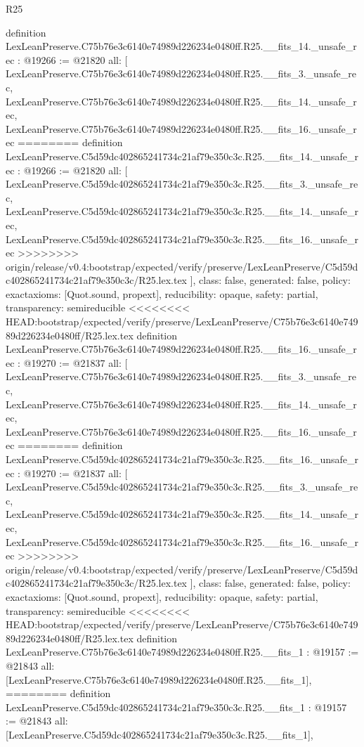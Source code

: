 \begin{lexlean}{R25}
\begin{coremodule}
{{{{{{{{{{{{{{{{{{{{{{{{{{{{{{{{{{{{{{{{{{{{{{{{{{{{{{{{{{{{{{{{{{{{{{{{{{{{{{{{{{{{{{{{{definition LexLeanPreserve.C75b76e3c6140e74989d226234e0480ff.R25.__fits_14._unsafe_rec : @19266 := @21820 {
  all: [
    LexLeanPreserve.C75b76e3c6140e74989d226234e0480ff.R25.__fits_3._unsafe_rec,
    LexLeanPreserve.C75b76e3c6140e74989d226234e0480ff.R25.__fits_14._unsafe_rec,
    LexLeanPreserve.C75b76e3c6140e74989d226234e0480ff.R25.__fits_16._unsafe_rec
========
definition LexLeanPreserve.C5d59dc402865241734c21af79e350c3c.R25.__fits_14._unsafe_rec : @19266 := @21820 {
  all: [
    LexLeanPreserve.C5d59dc402865241734c21af79e350c3c.R25.__fits_3._unsafe_rec,
    LexLeanPreserve.C5d59dc402865241734c21af79e350c3c.R25.__fits_14._unsafe_rec,
    LexLeanPreserve.C5d59dc402865241734c21af79e350c3c.R25.__fits_16._unsafe_rec
>>>>>>>> origin/release/v0.4:bootstrap/expected/verify/preserve/LexLeanPreserve/C5d59dc402865241734c21af79e350c3c/R25.lex.tex
  ],
  class: false,
  generated: false,
  policy: exact{axioms: [Quot.sound, propext]},
  reducibility: opaque{},
  safety: partial,
  transparency: semireducible
}
<<<<<<<< HEAD:bootstrap/expected/verify/preserve/LexLeanPreserve/C75b76e3c6140e74989d226234e0480ff/R25.lex.tex
definition LexLeanPreserve.C75b76e3c6140e74989d226234e0480ff.R25.__fits_16._unsafe_rec : @19270 := @21837 {
  all: [
    LexLeanPreserve.C75b76e3c6140e74989d226234e0480ff.R25.__fits_3._unsafe_rec,
    LexLeanPreserve.C75b76e3c6140e74989d226234e0480ff.R25.__fits_14._unsafe_rec,
    LexLeanPreserve.C75b76e3c6140e74989d226234e0480ff.R25.__fits_16._unsafe_rec
========
definition LexLeanPreserve.C5d59dc402865241734c21af79e350c3c.R25.__fits_16._unsafe_rec : @19270 := @21837 {
  all: [
    LexLeanPreserve.C5d59dc402865241734c21af79e350c3c.R25.__fits_3._unsafe_rec,
    LexLeanPreserve.C5d59dc402865241734c21af79e350c3c.R25.__fits_14._unsafe_rec,
    LexLeanPreserve.C5d59dc402865241734c21af79e350c3c.R25.__fits_16._unsafe_rec
>>>>>>>> origin/release/v0.4:bootstrap/expected/verify/preserve/LexLeanPreserve/C5d59dc402865241734c21af79e350c3c/R25.lex.tex
  ],
  class: false,
  generated: false,
  policy: exact{axioms: [Quot.sound, propext]},
  reducibility: opaque{},
  safety: partial,
  transparency: semireducible
}
<<<<<<<< HEAD:bootstrap/expected/verify/preserve/LexLeanPreserve/C75b76e3c6140e74989d226234e0480ff/R25.lex.tex
definition LexLeanPreserve.C75b76e3c6140e74989d226234e0480ff.R25.__fits_1 : @19157 := @21843 {
  all: [LexLeanPreserve.C75b76e3c6140e74989d226234e0480ff.R25.__fits_1],
========
definition LexLeanPreserve.C5d59dc402865241734c21af79e350c3c.R25.__fits_1 : @19157 := @21843 {
  all: [LexLeanPreserve.C5d59dc402865241734c21af79e350c3c.R25.__fits_1],
}}}}}}}}}}}}}}}}}}}}}}}}}}}}}}}}}}}}}}}}}}}}}}}}}}}}}}}}}}}}}}}}}}}}}}}}}}}}}}}}}}}}}}}}}}}}}
\end{coremodule}
\end{lexlean}
